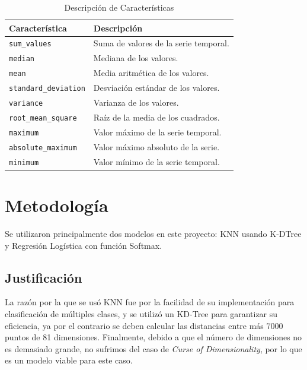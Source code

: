 \documentclass[conference]{IEEEtran}
\begin{document}
\begin{table}[htbp]
    \caption{Descripción de Características}
    \begin{center}
        \begin{tabular}{|l|l|}
        \hline
        \textbf{Característica} & \textbf{Descripción} \\
        \hline
        \texttt{sum\_values} & Suma de valores de la serie temporal.\\
        \hline
        \texttt{median} & Mediana de los valores.\\
        \hline
        \texttt{mean} & Media aritmética de los valores.\\
        \hline
        \texttt{standard\_deviation} & Desviación estándar de los valores.\\
        \hline
        \texttt{variance} & Varianza de los valores. \\
        \hline
        \texttt{root\_mean\_square} & Raíz de la media de los cuadrados. \\
        \hline
        \texttt{maximum} & Valor máximo de la serie temporal. \\
        \hline
        \texttt{absolute\_maximum} & Valor máximo absoluto de la serie. \\
        \hline
        \texttt{minimum} & Valor mínimo de la serie temporal. \\
        \hline
        \end{tabular}
        \label{tab2}
    \end{center}
\end{table}

\section{Metodología}
Se utilizaron principalmente dos modelos en este proyecto: KNN usando K-DTree y Regresión Logística con función Softmax.

\subsection{Justificación}
La razón por la que se usó KNN fue por la facilidad de su implementación para clasificación de múltiples clases, y se utilizó un KD-Tree para garantizar su eficiencia, ya por el contrario se deben calcular las distancias entre más 7000 puntos de 81 dimensiones. Finalmente, debido a que el número de dimensiones no es demasiado grande, no sufrimos del caso de \textit{Curse of Dimensionality}, por lo que es un modelo viable para este caso.
\end{document}
